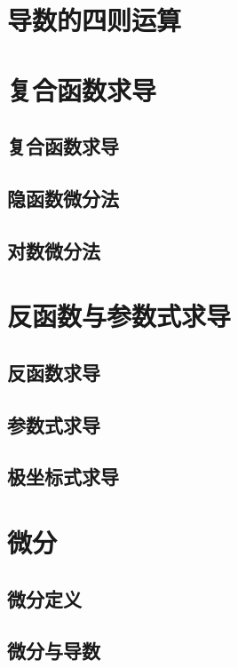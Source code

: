 \section{导数的四则运算}
\begin{exercise}
\item
\end{exercise}
\section{复合函数求导}
\subsection{复合函数求导}
\subsection{隐函数微分法}
\subsection{对数微分法}
\begin{exercise}
\item
\end{exercise}
\section{反函数与参数式求导}
\subsection{反函数求导}
\subsection{参数式求导}
\subsection{极坐标式求导}
\begin{exercise}
\item
\end{exercise}
\section{微\emspace 分}
\subsection{微分定义}
\subsection{微分与导数}
